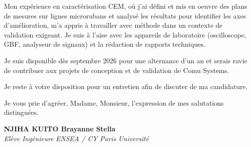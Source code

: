 \documentclass[a4paper,11pt]{article}
\begin{document}
Mon expérience en caractérisation CEM, où j'ai défini et mis en oeuvre des plans de mesures sur lignes microrubans et analysé les résultats pour identifier les axes d'amélioration, m'a appris à travailler avec méthode dans un contexte de validation exigeant. Je suis à l'aise avec les appareils de laboratoire (oscilloscope, GBF, analyseur de signaux) et la rédaction de rapports techniques.

Je suis disponible dès septembre 2026 pour une alternance d'un an et serais ravie de contribuer aux projets de conception et de validation de Comu Systems.

Je reste à votre disposition pour un entretien afin de discuter de ma candidature.

Je vous prie d'agréer, Madame, Monsieur, l'expression de mes salutations distinguées.

\vspace{0.8cm}

\textbf{NJIHA KUITO Brayanne Stella}\\
\textit{Elève Ingénieure ENSEA / CY Paris Université}
\end{document}
